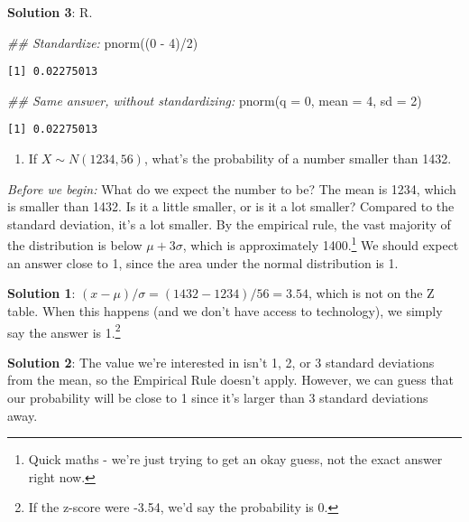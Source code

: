 \documentclass[
  letterpaper,
  DIV=11,
  numbers=noendperiod]{scrreprt}
\newenvironment{Shaded}{\begin{snugshade}}{\end{snugshade}}
\newcommand{\AttributeTok}[1]{\textcolor[rgb]{0.40,0.45,0.13}{#1}}
\newcommand{\DecValTok}[1]{\textcolor[rgb]{0.68,0.00,0.00}{#1}}
\newcommand{\DocumentationTok}[1]{\textcolor[rgb]{0.37,0.37,0.37}{\textit{#1}}}
\newcommand{\FunctionTok}[1]{\textcolor[rgb]{0.28,0.35,0.67}{#1}}
\newcommand{\NormalTok}[1]{\textcolor[rgb]{0.00,0.23,0.31}{#1}}
\newcommand{\SpecialCharTok}[1]{\textcolor[rgb]{0.37,0.37,0.37}{#1}}
\providecommand{\tightlist}{%
  \setlength{\itemsep}{0pt}\setlength{\parskip}{0pt}}\usepackage{longtable,booktabs,array}
\begin{document}
\textbf{Solution 3}: R.

\begin{Shaded}
\begin{Highlighting}[]
\DocumentationTok{\#\# Standardize:}
\FunctionTok{pnorm}\NormalTok{((}\DecValTok{0} \SpecialCharTok{{-}} \DecValTok{4}\NormalTok{)}\SpecialCharTok{/}\DecValTok{2}\NormalTok{)}
\end{Highlighting}
\end{Shaded}

\begin{verbatim}
[1] 0.02275013
\end{verbatim}

\begin{Shaded}
\begin{Highlighting}[]
\DocumentationTok{\#\# Same answer, without standardizing:}
\FunctionTok{pnorm}\NormalTok{(}\AttributeTok{q =} \DecValTok{0}\NormalTok{, }\AttributeTok{mean =} \DecValTok{4}\NormalTok{, }\AttributeTok{sd =} \DecValTok{2}\NormalTok{)}
\end{Highlighting}
\end{Shaded}

\begin{verbatim}
[1] 0.02275013
\end{verbatim}

\begin{enumerate}
\def\labelenumi{\arabic{enumi}.}
\setcounter{enumi}{1}
\tightlist
\item
  If \(X\sim N(1234, 56)\), what's the probability of a number smaller
  than 1432.
\end{enumerate}

\emph{Before we begin:} What do we expect the number to be? The mean is
1234, which is smaller than 1432. Is it a little smaller, or is it a lot
smaller? Compared to the standard deviation, it's a lot smaller. By the
empirical rule, the vast majority of the distribution is below
\(\mu + 3\sigma\), which is approximately 1400.\footnote{Quick maths -
  we're just trying to get an okay guess, not the exact answer right
  now.} We should expect an answer close to 1, since the area under the
normal distribution is 1.

\textbf{Solution 1}: \((x-\mu)/\sigma = (1432-1234)/56 = 3.54\), which
is not on the Z table. When this happens (and we don't have access to
technology), we simply say the answer is 1.\footnote{If the z-score were
  -3.54, we'd say the probability is 0.}

\textbf{Solution 2}: The value we're interested in isn't 1, 2, or 3
standard deviations from the mean, so the Empirical Rule doesn't apply.
However, we can guess that our probability will be close to 1 since it's
larger than 3 standard deviations away.
\end{document}

